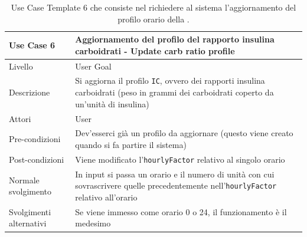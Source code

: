 \documentclass[twocolumn]{article}
\begin{document}
\begin{table}
    \centering
    \captionsetup{justification=centering}
    \begin{tabular}{|p{4.5cm}|p{9.5cm}|}
        \hline
        Use Case 6 & Aggiornamento del profilo del rapporto insulina carboidrati - Update carb ratio profile\\
        \hline
        Livello & User Goal \\
        \hline
        Descrizione & Si aggiorna il profilo \texttt{IC}, ovvero dei rapporti insulina carboidrati (peso in grammi dei carboidrati coperto da un'unità di insulina)\\
        \hline
        Attori & User \\
        \hline
        Pre-condizioni & Dev'esserci già un profilo da aggiornare (questo viene creato quando si fa partire il sistema)\\
        \hline
        Post-condizioni & Viene modificato l'\texttt{hourlyFactor} relativo al singolo orario\\
        \hline
        Normale svolgimento & In input si passa un orario e il numero di unità con cui sovrascrivere quelle precedentemente nell'\texttt{hourlyFactor} relativo all'orario\\
        \hline
        Svolgimenti alternativi & Se viene immesso come orario 0 o 24, il funzionamento è il medesimo\\
        \hline
    \end{tabular}
    \caption{Use Case Template 6 che consiste nel richiedere al sistema l'aggiornamento del profilo orario della .}
    \label{tab:uc6}
\end{table}
\end{document}
